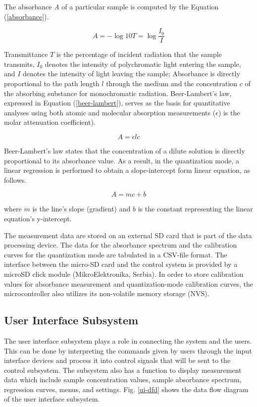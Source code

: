 \documentclass[conference]{IEEEtran}
\begin{document}
The absorbance \emph{A} of a particular sample is computed by the Equation (\ref{absorbance}).

    \begin{equation}
    A=-\log10{T}=\log{\frac{I_{0}}{I}}
    \label{absorbance}
    \end{equation}

Transmittance $T$ is the percentage of incident radiation that the sample transmits, $I_0$ denotes the intensity of polychromatic light entering the sample, and $I$ denotes the intensity of light leaving the sample;
Absorbance is directly proportional to the path length $l$ through the medium and the concentration $c$ of the absorbing substance for monochromatic radiation.
Beer-Lambert's law, expressed in Equation (\ref{beer-lambert}), serves as the basis for quantitative analyses using both atomic and molecular absorption measurements ($\epsilon$) is the molar attenuation coefficient)\cite{b6}.

    \begin{equation}
    A={\epsilon}{l}{c}
    \label{beer-lambert}
    \end{equation}

Beer-Lambert's law states that the concentration of a dilute solution is directly proportional to its absorbance value.
As a result, in the quantization mode, a linear regression is performed to obtain a slope-intercept form linear equation, as follows. 

    \begin{equation}
    A={m}{c}+{b}
    \label{linear-eq}
    \end{equation}

where $m$ is the line's slope (gradient) and $b$ is the constant representing the linear equation's y-intercept.

The measurement data are stored on an external SD card that is part of the data processing device.
The data for the absorbance spectrum and the calibration curves for the quantization mode are tabulated in a CSV-file format.
The interface between the micro-SD card and the control system is provided by a microSD click module (MikroElektronika, Serbia).
In order to store calibration values for absorbance measurement and quantization-mode calibration curves, the microcontroller also utilizes its non-volatile memory storage (NVS).

\subsection{User Interface Subsystem}
The user interface subsystem plays a role in connecting the system and the users.
This can be done by interpreting the commands given by users through the input interface devices and process it into control signals that will be sent to the control subsystem.
The subsystem also has a function to display measurement data which include sample concentration values, sample absorbance spectrum, regression curves, menus, and settings.
Fig. \ref{ui-dfd} shows the data flow diagram of the user interface subsystem.
\end{document}
